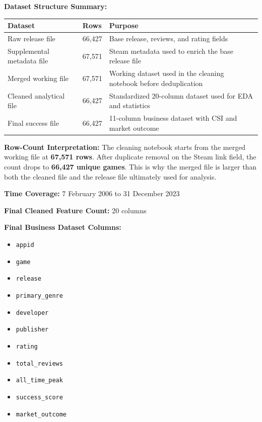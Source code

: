 \documentclass[12pt,a4paper]{report}
\begin{document}
\textbf{Dataset Structure Summary:}

\begin{center}
\begin{tabular}{p{5cm}p{3cm}p{5cm}}
\toprule
\textbf{Dataset} & \textbf{Rows} & \textbf{Purpose} \\
\midrule
Raw release file & 66,427 & Base release, reviews, and rating fields \\
Supplemental metadata file & 67,571 & Steam metadata used to enrich the base release file \\
Merged working file & 67,571 & Working dataset used in the cleaning notebook before deduplication \\
Cleaned analytical file & 66,427 & Standardized 20-column dataset used for EDA and statistics \\
Final success file & 66,427 & 11-column business dataset with CSI and market outcome \\
\bottomrule
\end{tabular}
\end{center}

\textbf{Row-Count Interpretation:} The cleaning notebook starts from the merged working file at \textbf{67,571 rows}. After duplicate removal on the Steam link field, the count drops to \textbf{66,427 unique games}. This is why the merged file is larger than both the cleaned file and the release file ultimately used for analysis.

\textbf{Time Coverage:} 7 February 2006 to 31 December 2023

\textbf{Final Cleaned Feature Count:} 20 columns

\textbf{Final Business Dataset Columns:}
\begin{itemize}
\item \texttt{appid}
\item \texttt{game}
\item \texttt{release}
\item \texttt{primary\_genre}
\item \texttt{developer}
\item \texttt{publisher}
\item \texttt{rating}
\item \texttt{total\_reviews}
\item \texttt{all\_time\_peak}
\item \texttt{success\_score}
\item \texttt{market\_outcome}
\end{itemize}
\end{document}
